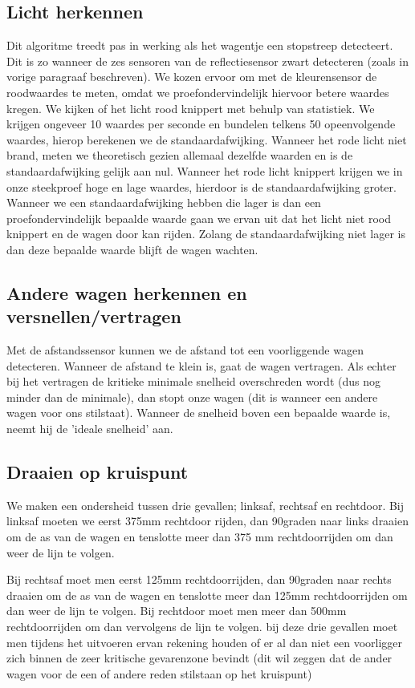 \documentclass[a4paper,twoside,kulak]{kulakreport}
\begin{document}
\subsection{Licht herkennen}
Dit algoritme treedt pas in werking als het wagentje een stopstreep detecteert. Dit is zo wanneer de zes sensoren van de reflectiesensor zwart detecteren (zoals in
vorige paragraaf beschreven). 
We kozen ervoor om met de kleurensensor de roodwaardes te meten, omdat we proefondervindelijk hiervoor betere waardes kregen. We kijken of het licht rood knippert met behulp van statistiek. We krijgen ongeveer 10 waardes per seconde en bundelen telkens 50 opeenvolgende waardes, hierop berekenen we de standaardafwijking. Wanneer het rode licht niet brand, meten we theoretisch gezien allemaal dezelfde waarden en is de standaardafwijking gelijk aan nul. Wanneer het rode licht knippert krijgen we in onze steekproef hoge en lage waardes, hierdoor is de standaardafwijking groter. Wanneer we een standaardafwijking hebben die lager is dan een proefondervindelijk bepaalde waarde gaan we ervan uit dat het licht niet rood knippert en de wagen door kan rijden. Zolang de standaardafwijking niet lager is dan deze bepaalde waarde blijft de wagen wachten.

\subsection{Andere wagen herkennen en versnellen/vertragen}

Met de afstandssensor kunnen we de afstand tot een voorliggende wagen detecteren. Wanneer de afstand te klein is, gaat de wagen vertragen. Als echter bij het vertragen de kritieke minimale snelheid overschreden wordt (dus nog minder dan de minimale), dan stopt onze wagen (dit is wanneer een andere wagen voor ons stilstaat). Wanneer de snelheid boven een bepaalde waarde is, neemt hij de 'ideale snelheid' aan.

\subsection{Draaien op kruispunt}
We maken een ondersheid tussen drie gevallen; linksaf, rechtsaf en rechtdoor. Bij linksaf moeten we eerst 375mm rechtdoor rijden, dan 90graden naar links draaien om de as van de wagen en tenslotte meer dan 375 mm rechtdoorrijden om dan weer de lijn te volgen.

Bij rechtsaf moet men eerst 125mm rechtdoorrijden, dan 90graden naar rechts draaien om de as van de wagen en tenslotte meer dan 125mm rechtdoorrijden om dan weer de lijn te volgen. Bij rechtdoor moet men meer dan 500mm rechtdoorrijden om dan vervolgens de lijn te volgen. bij deze drie gevallen moet men tijdens het uitvoeren ervan rekening houden of er al dan niet een voorligger zich binnen de zeer kritische gevarenzone bevindt (dit wil zeggen dat de ander wagen voor de een of andere reden stilstaan op het kruispunt)
\end{document}
